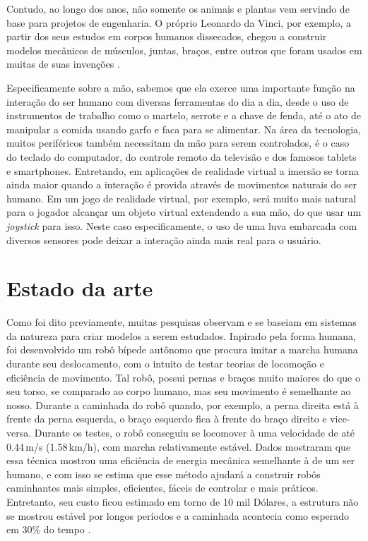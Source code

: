 \documentclass[
	12pt,				%
	openright,			%
	oneside,			%
	a4paper,			%
	english,			%
	brazil				%
	]{abntex2}
\begin{document}
		Contudo, ao longo dos anos, não somente os animais e plantas vem servindo de base para projetos de engenharia. O próprio Leonardo da Vinci, por exemplo, a partir dos seus estudos em corpos humanos dissecados, chegou a construir modelos mecânicos de músculos, juntas, braços, entre outros que foram usados em muitas de suas invenções \cite{rosheim2006leonardo}.
		
		Especificamente sobre a mão, sabemos que ela exerce uma importante função na interação do ser humano com diversas ferramentas do dia a dia, desde o uso de instrumentos de trabalho como o martelo, serrote e a chave de fenda, até o ato de manipular a comida usando garfo e faca para se alimentar. Na área da tecnologia, muitos periféricos também necessitam da mão para serem controlados, é o caso do teclado do computador, do controle remoto da televisão e dos famosos tablets e smartphones.	Entretando, em aplicações de realidade virtual a imersão se torna ainda maior quando a interação é provida através de movimentos naturais do ser humano. Em um jogo de realidade virtual, por exemplo, será muito mais natural para o jogador alcançar um objeto virtual extendendo a sua mão, do que usar um \textit{joystick} para isso. Neste caso especificamente, o uso de uma luva embarcada com diversos sensores pode deixar a interação ainda mais real para o usuário. 
	

		\section{Estado da arte}

		Como foi dito previamente, muitas pesquisas observam e se baseiam em sistemas da natureza para criar modelos a serem estudados. Inpirado pela forma humana, foi desenvolvido um robô bípede autônomo que procura imitar a marcha humana durante seu deslocamento, com o intuito de testar teorias de locomoção e eficiência de movimento. Tal robô, possui pernas e braços muito maiores do que o seu torso, se comparado ao corpo humano, mas seu movimento é semelhante ao nosso. Durante a caminhada do robô quando, por exemplo, a perna direita está à frente da perna esquerda, o braço esquerdo fica à frente do braço direito e vice-versa. Durante os testes, o robô conseguiu se locomover à uma velocidade de até 0.44$\,$m/s (1.58$\,$km/h), com marcha relativamente estável. Dados mostraram que essa técnica mostrou uma eficiência de energia mecânica semelhante à de um ser humano, e com isso se estima que esse método ajudará a construir robôs caminhantes mais simples, eficientes, fáceis de controlar e mais práticos. Entretanto, seu custo ficou estimado em torno de 10 mil Dólares, a estrutura não se mostrou estável por longos períodos e a caminhada acontecia como esperado em 30\% do tempo \cite{collins2005walkrobot}.
\end{document}
